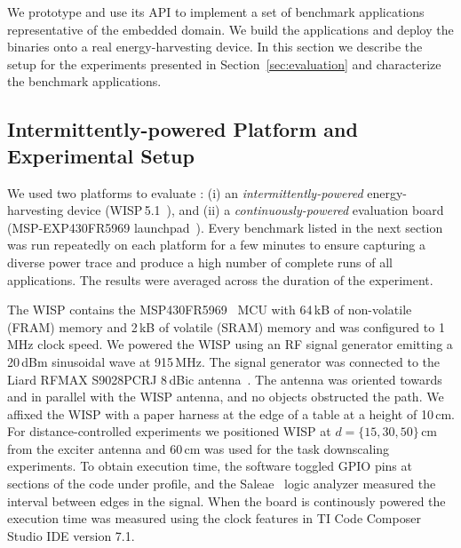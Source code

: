We prototype \sys and use its API to implement a set of benchmark
applications representative of the embedded domain. We build the applications
and deploy the binaries onto a real energy-harvesting device. In this section
we describe the setup for the experiments presented in
Section~\ref{sec:evaluation} and characterize the benchmark applications.

\subsection{Intermittently-powered Platform and Experimental Setup}
\label{sec:results_hardware_software}

We used two platforms to evaluate \sys: (i) an \emph{intermittently-powered}
energy-harvesting device (WISP\,5.1~\cite{wisp5,wisp}), and (ii) a \emph{continuously-powered} evaluation
board (MSP-EXP430FR5969 launchpad~\cite{MSP-EXP430FR5969_launchpad}).
%
Every benchmark listed in the next section was run repeatedly on
each platform for a few minutes to ensure capturing a diverse power 
trace and produce a high number of complete runs of all applications.
The results were averaged across the duration of the experiment.

%
The WISP contains the MSP430FR5969~\cite{wolverine} MCU with 64\,kB of
non-volatile (FRAM) memory and 2\,kB of volatile (SRAM) memory and was
configured to 1\,MHz clock speed.
%
We powered the WISP using an RF signal generator emitting  a 20\,dBm sinusoidal wave at 915\,MHz.
The signal generator was connected to the Liard RFMAX S9028PCRJ 8\,dBic
antenna~\cite{atlas2015}.
%
The antenna was oriented towards and in parallel with the WISP antenna, and
no objects obstructed the path.
%
We affixed the WISP with a paper harness at the edge of a table at a height of 10\,cm.
%
For distance-controlled experiments we positioned WISP at $d=\{15, 30,
50\}$\,cm from the exciter antenna and 60\,cm was used for the task downscaling
experiments.
%
%
To obtain execution time, the software toggled GPIO pins at sections of the code
under profile, and the Saleae~\cite{saleae} logic analyzer measured
the interval between edges in the signal. When the board is continously powered the 
execution time was measured using the clock features in TI Code Composer Studio IDE version 7.1.
%

